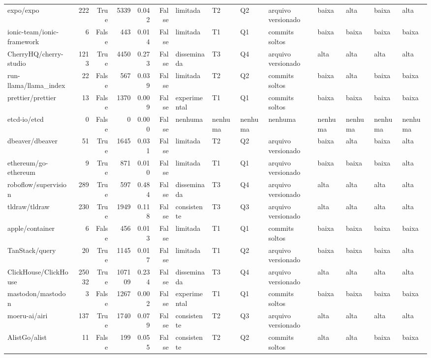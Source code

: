 \begin{tabular}{lrrrrrllllllll}
expo/expo & 222 & True & 5339 & 0.042 & False & limitada & T2 & Q2 & arquivo versionado & baixa & alta & baixa & alta \\
ionic-team/ionic-framework & 6 & False & 443 & 0.014 & False & limitada & T1 & Q1 & commits soltos & baixa & baixa & baixa & baixa \\
CherryHQ/cherry-studio & 1213 & True & 4450 & 0.273 & False & disseminada & T3 & Q4 & arquivo versionado & alta & alta & alta & alta \\
run-llama/llama_index & 22 & False & 567 & 0.039 & False & limitada & T2 & Q2 & commits soltos & baixa & alta & baixa & baixa \\
prettier/prettier & 13 & False & 1370 & 0.009 & False & experimental & T1 & Q1 & commits soltos & baixa & baixa & baixa & baixa \\
etcd-io/etcd & 0 & False & 0 & 0.000 & False & nenhuma & nenhuma & nenhuma & nenhuma & nenhuma & nenhuma & nenhuma & nenhuma \\
dbeaver/dbeaver & 51 & True & 1645 & 0.031 & False & limitada & T2 & Q2 & arquivo versionado & baixa & alta & baixa & alta \\
ethereum/go-ethereum & 9 & True & 871 & 0.010 & False & limitada & T1 & Q1 & arquivo versionado & baixa & baixa & baixa & alta \\
roboflow/supervision & 289 & True & 597 & 0.484 & False & disseminada & T3 & Q4 & arquivo versionado & alta & alta & alta & alta \\
tldraw/tldraw & 230 & True & 1949 & 0.118 & False & consistente & T3 & Q3 & arquivo versionado & alta & alta & alta & alta \\
apple/container & 6 & False & 456 & 0.013 & False & limitada & T1 & Q1 & commits soltos & baixa & baixa & baixa & baixa \\
TanStack/query & 20 & True & 1145 & 0.017 & False & limitada & T1 & Q2 & arquivo versionado & baixa & baixa & baixa & alta \\
ClickHouse/ClickHouse & 25032 & True & 107109 & 0.234 & False & disseminada & T3 & Q4 & arquivo versionado & alta & alta & alta & alta \\
mastodon/mastodon & 3 & False & 1267 & 0.002 & False & experimental & T1 & Q1 & commits soltos & baixa & baixa & baixa & baixa \\
moeru-ai/airi & 137 & True & 1740 & 0.079 & False & consistente & T2 & Q3 & arquivo versionado & alta & alta & alta & alta \\
AlistGo/alist & 11 & False & 199 & 0.055 & False & consistente & T2 & Q2 & commits soltos & alta & alta & baixa & baixa \\

\end{tabular}
